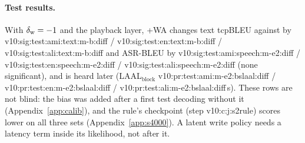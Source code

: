 \paragraph{Test results.} With $\delta_{\mathrm{w}}=-1$ and the playback layer, \sys{}+WA changes text tcpBLEU against \sys{} by
\num{v10:sig:test:ami:text:m-b:diff} / \num{v10:sig:test:en:text:m-b:diff} / \num{v10:sig:test:ali:text:m-b:diff} and ASR-BLEU by \num{v10:sig:test:ami:speech:m-e2:diff} /
\num{v10:sig:test:en:speech:m-e2:diff} / \num{v10:sig:test:ali:speech:m-e2:diff} (none significant), and is heard
later (LAAL$_\text{block}$ \num{v10:pr:test:ami:m-e2:bslaal:diff} / \num{v10:pr:test:en:m-e2:bslaal:diff} /
\num{v10:pr:test:ali:m-e2:bslaal:diff}\,s). These rows are not blind: the bias was added after a first test decoding
without it (Appendix~\ref{app:calib})\ifSfourK{}, and the rule's checkpoint (step \num{v10:c:j:s2rule}) scores lower
on all three sets (Appendix~\ref{app:s4000})\fi. A latent write policy needs a latency term inside its
likelihood, not after it.
